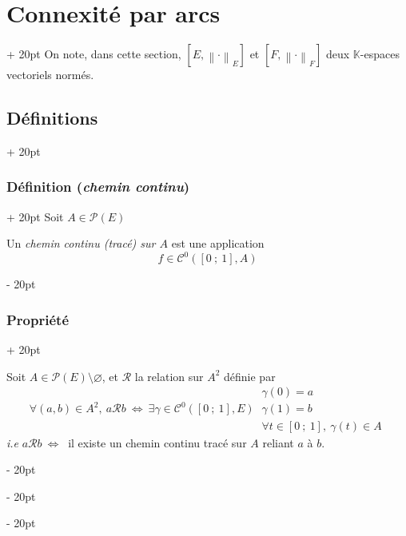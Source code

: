 \documentclass[a4paper, 12pt, twoside]{article}
\newcommand{\K}{\mathbb K}
\newcommand{\seg}[2]{\left[ #1\ ;\ #2 \right]}
\newcommand{\lr}[1]{\left( #1 \right)}
\newcommand{\norm}[1]{\left\lVert #1 \right\rVert}
\newcommand{\ssi}{\ \Leftrightarrow \ }
\newcommand{\ind}[1][20pt]{\advance\leftskip + #1}
\newcommand{\deind}[1][20pt]{\advance\leftskip - #1}
\newenvironment{indt}[2][20pt]{#2 \par \ind[#1]}{\par \deind} %
\begin{document}
    \vspace{12pt}
    
    \begin{indt}{\section{Connexité par arcs}}
        On note, dans cette section, $[E, \norm \cdot _E]$ et $[F, \norm \cdot _F]$ deux $\K$-espaces vectoriels normés.

        \begin{indt}{\subsection{Définitions}}
            \begin{indt}{\subsubsection{Définition (\textit{chemin continu})}}
                Soit $A \in \mathcal P(E)$

                Un \emph{chemin continu (tracé) sur $A$} est une application
                \[
                    f \in \mathcal C^0\!\lr{\seg 0 1, A}
                \]
            \end{indt}

            \vspace{12pt}
            
            \begin{indt}{\subsubsection{Propriété}}
                \label{5.1.2}

                Soit $A \in \mathcal P(E) \setminus \varnothing$, et $\mathcal R$ la relation sur $A^2$ définie par
                \[
                    \forall (a, b) \in A^2,\
                    a \mathcal R b
                    \ssi
                    \exists \gamma \in \mathcal C^0\!\lr{\seg 0 1, E}\
                    \begin{array}{|l}
                        \gamma(0) = a
                        \\
                        \gamma(1) = b
                        \\
                        \forall t \in \seg 0 1,\ \gamma(t) \in A
                    \end{array}
                \]
                \textit{i.e} $a \mathcal R b \ssi$ il existe un chemin continu tracé sur $A$ reliant $a$ à $b$.


\end{indt}
\end{indt}
\end{indt}
\end{document}
